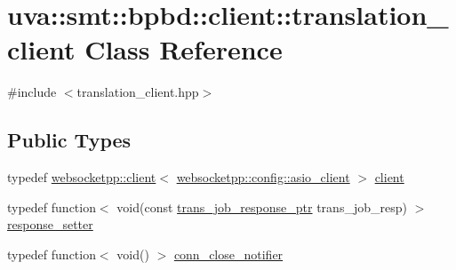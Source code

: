 \hypertarget{classuva_1_1smt_1_1bpbd_1_1client_1_1translation__client}{}\section{uva\+:\+:smt\+:\+:bpbd\+:\+:client\+:\+:translation\+\_\+client Class Reference}
\label{classuva_1_1smt_1_1bpbd_1_1client_1_1translation__client}


{\ttfamily \#include $<$translation\+\_\+client.\+hpp$>$}

\subsection*{Public Types}
\begin{DoxyCompactItemize}
\item 
typedef \hyperlink{classwebsocketpp_1_1client}{websocketpp\+::client}$<$ \hyperlink{structwebsocketpp_1_1config_1_1asio__client}{websocketpp\+::config\+::asio\+\_\+client} $>$ \hyperlink{classuva_1_1smt_1_1bpbd_1_1client_1_1translation__client_a390fa2321ff9549e1f31ca2dcbd4a88c}{client}
\item 
typedef function$<$ void(const \hyperlink{namespaceuva_1_1smt_1_1bpbd_1_1common_1_1messaging_a13f39e68e38d11dbd940edb12359e1a3}{trans\+\_\+job\+\_\+response\+\_\+ptr} trans\+\_\+job\+\_\+resp) $>$ \hyperlink{classuva_1_1smt_1_1bpbd_1_1client_1_1translation__client_aee49acfd2764e30f042c29b1d365f21d}{response\+\_\+setter}
\item 
typedef function$<$ void() $>$ \hyperlink{classuva_1_1smt_1_1bpbd_1_1client_1_1translation__client_a6bb76738c95be98f5d13370d8e6a1176}{conn\+\_\+close\+\_\+notifier}
\end{DoxyCompactItemize}
